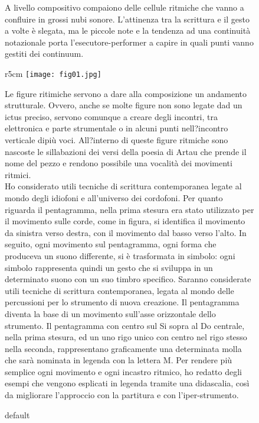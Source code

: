 \begin{figure}[htbp]
A livello compositivo compaiono delle cellule ritmiche che vanno a confluire in grossi nubi sonore. L'attinenza tra la scrittura e il gesto a volte è slegata, ma le piccole note e la tendenza ad una continuità notazionale porta l'esecutore-performer a capire in quali punti vanno gestiti dei continuum.


\begin{wrapfigure}{r}{5cm}
\centering
\texttt{[image: fig01.jpg]}
\caption{default}
\label{default}
\end{wrapfigure}

Le figure ritimiche servono a dare alla composizione un andamento strutturale. Ovvero, anche se molte figure non sono legate dad un ictus preciso, servono comunque a creare degli incontri, tra elettronica e parte strumentale o in alcuni punti nell?incontro verticale dipiù voci. All?interno di queste figure ritmiche sono nascoste le sillabazioni dei versi della poesia di Artau che prende il nome del pezzo e rendono possibile una vocalità dei movimenti ritmici. \\
Ho considerato utili tecniche di scrittura contemporanea legate al mondo degli idiofoni e all'universo dei cordofoni. Per quanto riguarda il pentagramma, nella prima stesura era stato utilizzato per il movimento sulle corde, come in figura, si identifica il movimento da sinistra verso destra, con il movimento dal basso verso l'alto. In seguito, ogni movimento sul pentagramma, ogni forma che produceva un suono differente, si è trasformata in simbolo: ogni simbolo rappresenta quindi un gesto che si sviluppa in un determinato suono con un suo timbro specifico.
Saranno considerate utili tecniche di scrittura contemporanea, legata al mondo delle percussioni per lo strumento di nuova creazione. Il pentagramma diventa la base di un movimento sull'asse orizzontale dello strumento. Il pentagramma con centro sul Si sopra al Do centrale, nella prima stesura, ed un uno rigo unico con centro nel rigo stesso nella seconda, rappresentano graficamente una determinata molla che sarà nominata in legenda con la lettera M. Per rendere più semplice ogni movimento e ogni incastro ritmico, ho redatto degli esempi che vengono esplicati in legenda tramite una didascalia, così da migliorare l'approccio con la partitura e con l'iper-strumento.


\end{figure}
